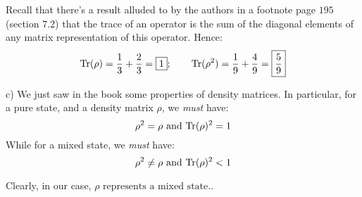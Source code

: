 \documentclass[solutions.tex]{subfiles}
\begin{document}
Recall that there's a result alluded to by the authors in a footnote
page $195$ (section $7.2$) that the trace of an operator is the sum of
the diagonal elements of any matrix representation of this operator.
Hence:
\[
	\text{Tr}(\rho) = \frac13 + \frac23 = \boxed{1};\qquad
	\text{Tr}(\rho^2) = \frac19 + \frac49 = \boxed{\frac59}
\]

c) We just saw in the book some properties of density matrices.
In particular, for a pure state, and a density matrix $\rho$, we
\textit{must} have:
\[
	\rho^2 = \rho \text{ and } \text{Tr}(\rho)^2 = 1
\]
While for a mixed state, we \textit{must} have:
\[
	\rho^2 \neq \rho \text{ and } \text{Tr}(\rho)^2 < 1
\]

Clearly, in our case, $\boxed{\rho\text{ represents a mixed state.}}$.
\end{document}
